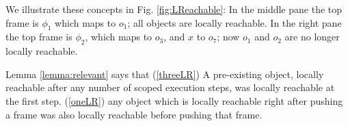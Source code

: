 {We illustrate these concepts in Fig. \ref{fig:LReachable}:  In the middle pane the top frame is $\phi_1$ which maps  to $o_1$; all objects are locally reachable. 
In the right pane the top frame is $\phi_2$, which maps  to $o_3$, and $x$ to $o_7$; now $o_1$ and $o_2$ are no longer locally reachable.

Lemma  \ref{lemma:relevant} %
says that 
(\ref{threeLR}) A pre-existing object, locally reachable after any number of scoped execution steps, was locally reachable at the first step.
(\ref{oneLR}) any object which is locally reachable right after pushing a frame was also locally reachable before pushing that frame.

}
